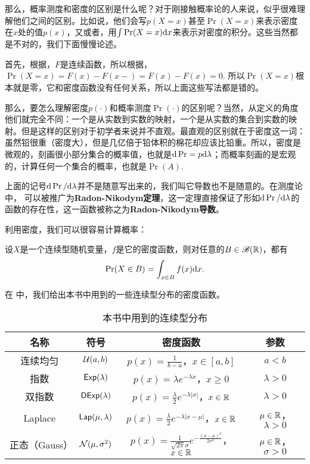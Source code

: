 那么，概率测度和密度的区别是什么呢？对于刚接触概率论的人来说，似乎很难理解他们之间的区别。比如说，他们会写$p(X=x)$甚至$\Pr(X=x)$来表示密度在$x$处的值$p(x)$，又或者，用$\int\Pr(X=x)\mathrm{d} x$来表示对密度的积分。这些当然都是不对的，我们下面慢慢论述。

首先，根据，$F$是连续函数，所以根据，$\Pr(X=x)=F(x)-F(x-)=F(x)-F(x)=0$. 所以$\Pr(X=x)$根本就是零，它和密度函数没有任何关系，所以上面这些写法都是错的。

那么，要怎么理解密度$p(\cdot)$和概率测度$\Pr(\cdot)$的区别呢？当然，从定义的角度他们就完全不同：一个是从实数到实数的映射，一个是从实数的集合到实数的映射。但是这样的区别对于初学者来说并不直观。最直观的区别就在于密度这一词：虽然铅很重（密度大），但是几亿倍于铅体积的棉花却应该比铅重。所以，密度是微观的，刻画很小部分集合的概率值，也就是$\mathrm{d}\Pr=p\mathrm{d} \lambda$；而概率刻画的是宏观的，计算任何一个集合的概率，也就是$\Pr(A)$.

\begin{remark}
    上面的记号$\mathrm{d}\Pr/\mathrm{d}\lambda$并不是随意写出来的，我们叫它导数也不是随意的。在测度论中， 可以被推广为\textbf{Radon-Nikodym定理}，这一定理直接保证了形如$\mathrm{d}\Pr/\mathrm{d}\lambda$的函数的存在性，这一函数被称之为\textbf{Radon-Nikodym导数}。
\end{remark}

利用密度，我们可以很容易计算概率：
\begin{proposition}\label{prop:continuous-prob}
设$X$是一个连续型随机变量，$f$是它的密度函数，则对任意的$B\in\mathscr{B}(\mathbb{R})$，都有
\[\Pr(X\in B)=\int_{x\in B}f(x)\mathrm{d} x.\]
\end{proposition}

在 中，我们给出本书中用到的一些连续型分布的密度函数。

\begin{table}[htbp]
\centering
\begin{tabular}{cccc}
\toprule
名称 & 符号 & 密度函数 & 参数 \\
\midrule
连续均匀\index{分布!连续均匀～} & $\mathcal{U}(a,b)$ &$p(x)=\frac{1}{b-a}$，$x\in[a,b]$ & $a<b$ \\
指数\index{分布!指数～} & $\mathsf{Exp}(\lambda)$ & $p(x)=\lambda e^{-\lambda x}$，$x\geq 0$ & $\lambda>0$ \\
双指数\index{分布!双指数～} & $\mathsf{DExp}(\lambda)$ & $p(x)=\frac{\lambda}{2}e^{-\lambda|x|}$，$x\in\mathbb{R}$ & $\lambda>0$ \\
Laplace\index{分布!Laplace～} & $\mathsf{Lap}(\mu,\lambda)$ & $p(x)=\frac{\lambda}{2}e^{-\lambda|x-\mu|}$，$x\in\mathbb{R}$ & $\mu\in\mathbb{R}$，$\lambda>0$ \\
正态（Gauss）\index{分布!正态～}\index{分布!Gauss～} & $\mathcal{N}(\mu,\sigma^2)$ & $p(x)=\frac{1}{\sqrt{2\pi}\sigma}e^{-\frac{(x-\mu)^2}{2\sigma^2}}$，$x\in\mathbb{R}$ & $\mu\in\mathbb{R}$，$\sigma>0$ \\
\bottomrule
\end{tabular}
\caption{本书中用到的连续型分布}
\label{tab:continuous-distribution}
\end{table}

